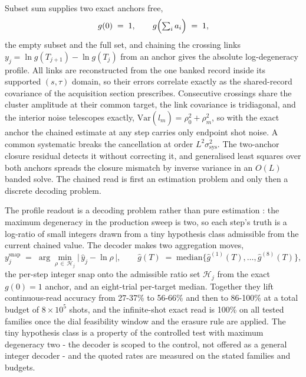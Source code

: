 Subset sum supplies two exact anchors free,
\begin{equation}\label{def:degeneracy-anchor}
g(0) \;=\; 1, \qquad g\Bigl(\textstyle\sum_i a_i\Bigr) \;=\; 1,
\end{equation}
the empty subset and the full set, and chaining the crossing links $y_j = \ln g(T_{j+1}) - \ln g(T_j)$ from an anchor gives the absolute log-degeneracy profile. All links are reconstructed from the one banked record inside its supported $(s, \tau)$ domain, so their errors correlate exactly as the shared-record covariance of the acquisition section prescribes. Consecutive crossings share the cluster amplitude at their common target, the link covariance is tridiagonal, and the interior noise telescopes exactly, $\mathrm{Var}(\hat{l}_m) = \rho_0^2 + \rho_m^2$, so with the exact anchor the chained estimate at any step carries only endpoint shot noise. A common systematic breaks the cancellation at order $L^2 \sigma_{\mathrm{sys}}^2$. The two-anchor closure residual detects it without correcting it, and generalised least squares over both anchors spreads the closure mismatch by inverse variance in an $O(L)$ banded solve. The chained read is first an estimation problem and only then a discrete decoding problem.

The profile readout is a decoding problem rather than pure estimation \cite{hua1990pencil,kay1993estimation}: the maximum degeneracy in the production sweep is two, so each step's truth is a log-ratio of small integers drawn from a tiny hypothesis class admissible from the current chained value. The decoder makes two aggregation moves,
\begin{equation}\label{def:integer-snap-and-trial-median}
y_j^{\mathrm{snap}} \;=\; \arg\min_{\rho \,\in\, \mathcal{H}_j} \bigl|\, \hat{y}_j - \ln\rho \,\bigr|, \qquad \hat{g}(T) \;=\; \mathrm{median}\bigl\{ \hat{g}^{(1)}(T), \dots, \hat{g}^{(8)}(T) \bigr\},
\end{equation}
the per-step integer snap onto the admissible ratio set $\mathcal{H}_j$ from the exact $g(0) = 1$ anchor, and an eight-trial per-target median. Together they lift continuous-read accuracy from 27-37\% to 56-66\% and then to 86-100\% at a total budget of $8 \times 10^5$ shots, and the infinite-shot exact read is 100\% on all tested families once the dial feasibility window and the erasure rule are applied. The tiny hypothesis class is a property of the controlled test with maximum degeneracy two - the decoder is scoped to the control, not offered as a general integer decoder - and the quoted rates are measured on the stated families and budgets.


